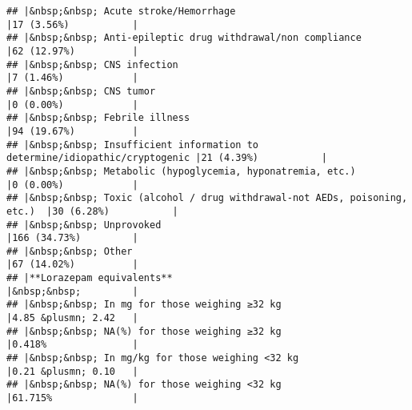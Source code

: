 \documentclass[
]{article}
\begin{document}
\begin{verbatim}
## |&nbsp;&nbsp; Acute stroke/Hemorrhage                                      |17 (3.56%)           |
## |&nbsp;&nbsp; Anti-epileptic drug withdrawal/non compliance                |62 (12.97%)          |
## |&nbsp;&nbsp; CNS infection                                                |7 (1.46%)            |
## |&nbsp;&nbsp; CNS tumor                                                    |0 (0.00%)            |
## |&nbsp;&nbsp; Febrile illness                                              |94 (19.67%)          |
## |&nbsp;&nbsp; Insufficient information to determine/idiopathic/cryptogenic |21 (4.39%)           |
## |&nbsp;&nbsp; Metabolic (hypoglycemia, hyponatremia, etc.)                 |0 (0.00%)            |
## |&nbsp;&nbsp; Toxic (alcohol / drug withdrawal-not AEDs, poisoning, etc.)  |30 (6.28%)           |
## |&nbsp;&nbsp; Unprovoked                                                   |166 (34.73%)         |
## |&nbsp;&nbsp; Other                                                        |67 (14.02%)          |
## |**Lorazepam equivalents**                                                 |&nbsp;&nbsp;         |
## |&nbsp;&nbsp; In mg for those weighing ≥32 kg                              |4.85 &plusmn; 2.42   |
## |&nbsp;&nbsp; NA(%) for those weighing ≥32 kg                              |0.418%               |
## |&nbsp;&nbsp; In mg/kg for those weighing <32 kg                           |0.21 &plusmn; 0.10   |
## |&nbsp;&nbsp; NA(%) for those weighing <32 kg                              |61.715%              |
\end{verbatim}
\end{document}
